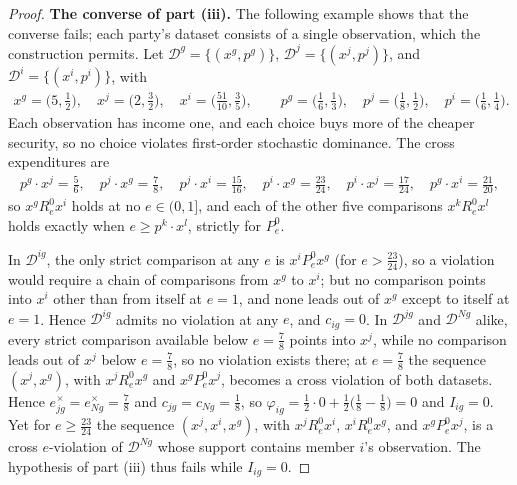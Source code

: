 \documentclass[11 pt]{article}
\begin{document}
\begin{proof}
\textbf{The converse of part (iii).} The following example shows that the converse fails; each party's dataset consists of a single observation, which the construction permits. Let $\mathcal{D}^{g} = \{ (x^{g}, p^{g}) \}$, $\mathcal{D}^{j} = \{ (x^{j}, p^{j}) \}$, and $\mathcal{D}^{i} = \{ (x^{i}, p^{i}) \}$, with
\begin{align*}
x^{g} = \bigl( 5, \tfrac{1}{2} \bigr), \quad
x^{j} = \bigl( 2, \tfrac{3}{2} \bigr), \quad
x^{i} = \bigl( \tfrac{51}{10}, \tfrac{3}{5} \bigr),
\qquad
p^{g} = \bigl( \tfrac{1}{6}, \tfrac{1}{3} \bigr), \quad
p^{j} = \bigl( \tfrac{1}{8}, \tfrac{1}{2} \bigr), \quad
p^{i} = \bigl( \tfrac{1}{6}, \tfrac{1}{4} \bigr).
\end{align*}
Each observation has income one, and each choice buys more of the cheaper security, so no choice violates first-order stochastic dominance. The cross expenditures are
\begin{align*}
p^{g} \cdot x^{j} = \tfrac{5}{6}, \quad
p^{j} \cdot x^{g} = \tfrac{7}{8}, \quad
p^{j} \cdot x^{i} = \tfrac{15}{16}, \quad
p^{i} \cdot x^{g} = \tfrac{23}{24}, \quad
p^{i} \cdot x^{j} = \tfrac{17}{24}, \quad
p^{g} \cdot x^{i} = \tfrac{21}{20},
\end{align*}
so $x^{g} \mathrel{R^{0}_{e}} x^{i}$ holds at no $e \in (0,1]$, and each of the other five comparisons $x^{k} \mathrel{R^{0}_{e}} x^{l}$ holds exactly when $e \geq p^{k} \cdot x^{l}$, strictly for $\mathrel{P^{0}_{e}}$.

In $\mathcal{D}^{ig}$, the only strict comparison at any $e$ is $x^{i} \mathrel{P^{0}_{e}} x^{g}$ (for $e > \tfrac{23}{24}$), so a violation would require a chain of comparisons from $x^{g}$ to $x^{i}$; but no comparison points into $x^{i}$ other than from itself at $e = 1$, and none leads out of $x^{g}$ except to itself at $e = 1$. Hence $\mathcal{D}^{ig}$ admits no violation at any $e$, and $c_{ig} = 0$. In $\mathcal{D}^{jg}$ and $\mathcal{D}^{Ng}$ alike, every strict comparison available below $e = \tfrac{7}{8}$ points into $x^{j}$, while no comparison leads out of $x^{j}$ below $e = \tfrac{7}{8}$, so no violation exists there; at $e = \tfrac{7}{8}$ the sequence $(x^{j}, x^{g})$, with $x^{j} \mathrel{R^{0}_{e}} x^{g}$ and $x^{g} \mathrel{P^{0}_{e}} x^{j}$, becomes a cross violation of both datasets. Hence $e^{\times}_{jg} = e^{\times}_{Ng} = \tfrac{7}{8}$ and $c_{jg} = c_{Ng} = \tfrac{1}{8}$, so $\varphi_{ig} = \tfrac{1}{2} \cdot 0 + \tfrac{1}{2} \bigl( \tfrac{1}{8} - \tfrac{1}{8} \bigr) = 0$ and $I_{ig} = 0$. Yet for $e \geq \tfrac{23}{24}$ the sequence $(x^{j}, x^{i}, x^{g})$, with $x^{j} \mathrel{R^{0}_{e}} x^{i}$, $x^{i} \mathrel{R^{0}_{e}} x^{g}$, and $x^{g} \mathrel{P^{0}_{e}} x^{j}$, is a cross $e$-violation of $\mathcal{D}^{Ng}$ whose support contains member $i$'s observation. The hypothesis of part (iii) thus fails while $I_{ig} = 0$.
\end{proof}
\end{document}
